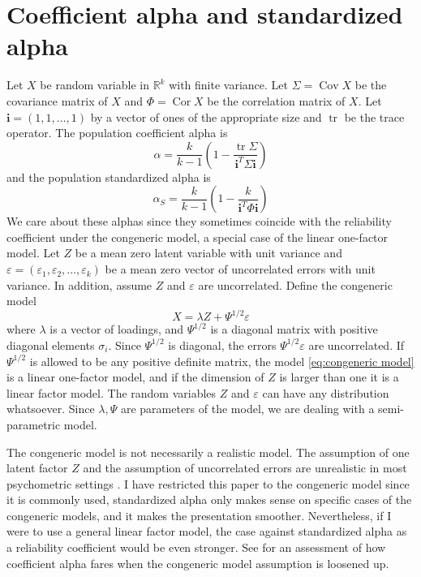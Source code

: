 \documentclass[twoside]{article}
\DeclareMathOperator{\tr}{tr}
\DeclareMathOperator{\Cor}{Cor}
\DeclareMathOperator{\Cov}{Cov}
\begin{document}
\section{Coefficient alpha and standardized alpha}
\label{sec:coefficienta alpha}

Let $X$ be random variable in $\mathbb{R}^{k}$ with finite variance.
Let $\Sigma=\Cov X$ be the covariance matrix of $X$ and $\Phi=\Cor X$
be the correlation matrix of $X$. Let $\mathbf{i}=(1,1,\ldots,1)$ by a vector of ones of the appropriate size and $\tr$ be the trace operator.
The population coefficient alpha \citep[][eq. 2]{cronbach1951coefficient} is
\begin{equation}
\alpha =  \frac{k}{k-1}\left(1-\frac{\tr\Sigma}{\mathbf{i}^{T}\Sigma\mathbf{i}}\right)\label{eq:Coefficient alpha}
\end{equation}
and the population standardized alpha \citep[][eq. 2]{Falk2011-ae} is
\begin{equation}
\alpha_S=\frac{k}{k-1}\left(1-\frac{k}{\mathbf{i}^{T}\Phi\mathbf{i}}\right)\label{eq:standardized alpha}
\end{equation}
We care about these alphas since they sometimes coincide with the reliability coefficient under the congeneric model, a special case of the linear one-factor model. Let $Z$ be a mean zero latent variable with unit variance and $\varepsilon=(\varepsilon_{1},\varepsilon_{2},\ldots,\varepsilon_{k})$
be a mean zero vector of uncorrelated errors with unit variance. In addition, assume $Z$ and $\varepsilon$ are uncorrelated. Define the congeneric model
\begin{equation}
X=\lambda Z+\Psi^{1/2}\varepsilon\label{eq:congeneric model}
\end{equation}
where $\lambda$ is a vector of loadings, and $\Psi^{1/2}$ is a diagonal matrix with positive diagonal elements $\sigma_i$. Since $\Psi^{1/2}$ is diagonal, the errors $\Psi^{1/2}\varepsilon$ are uncorrelated. If $\Psi^{1/2}$ is allowed to be any positive definite matrix, the model \eqref{eq:congeneric model} is a linear one-factor model, and if the dimension of $Z$ is larger than one it is a linear factor model. The random variables $Z$ and $\varepsilon$ can have any distribution whatsoever. Since $\lambda,\Psi$ are parameters of the model, we are dealing with a semi-parametric model. 

The congeneric model is not necessarily a realistic model. The assumption of one latent factor $Z$ and the assumption of uncorrelated errors are unrealistic in most psychometric settings \citep[][section 1.2 -- 1.3]{Green2009-le}. I have restricted this paper to the congeneric model since it is commonly used, standardized alpha only makes sense on specific cases of the congeneric models, and it makes the presentation smoother. Nevertheless, if I were to use a general linear factor model, the case against standardized alpha as a reliability coefficient would be even stronger. See \citet[][section 2]{Green2009-le} for an assessment of how coefficient alpha fares when the congeneric model assumption is loosened up.
\end{document}
